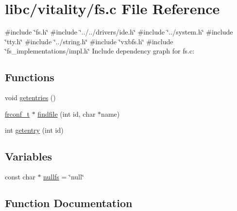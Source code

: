 \hypertarget{a00143}{}\section{libc/vitality/fs.c File Reference}
\label{a00143}
{\ttfamily \#include \char`\"{}fs.\+h\char`\"{}}\newline
{\ttfamily \#include \char`\"{}../../drivers/ide.\+h\char`\"{}}\newline
{\ttfamily \#include \char`\"{}../system.\+h\char`\"{}}\newline
{\ttfamily \#include \char`\"{}tty.\+h\char`\"{}}\newline
{\ttfamily \#include \char`\"{}../string.\+h\char`\"{}}\newline
{\ttfamily \#include \char`\"{}vxbfs.\+h\char`\"{}}\newline
{\ttfamily \#include \char`\"{}fs\+\_\+implementations/impl.\+h\char`\"{}}\newline
Include dependency graph for fs.\+c\+:
\subsection*{Functions}
\begin{DoxyCompactItemize}
\item 
void \hyperlink{a00143_a414110036132977c34813673360e1a63_a414110036132977c34813673360e1a63}{getentries} ()
\item 
\hyperlink{a00185_a752f1bef3c13b98d682fddc44a9e47c8_a752f1bef3c13b98d682fddc44a9e47c8}{frconf\+\_\+t} $\ast$ \hyperlink{a00143_a5c15724e6f3ef2c0df67ccedfc8639eb_a5c15724e6f3ef2c0df67ccedfc8639eb}{findfile} (int id, char $\ast$name)
\item 
int \hyperlink{a00143_a3fb32d07d3bd05144a196c94fc59c0d1_a3fb32d07d3bd05144a196c94fc59c0d1}{getentry} (int id)
\end{DoxyCompactItemize}
\subsection*{Variables}
\begin{DoxyCompactItemize}
\item 
const char $\ast$ \hyperlink{a00143_a36265ac74fd925405e1179e799961f1e_a36265ac74fd925405e1179e799961f1e}{nullfs} = \char`\"{}null\char`\"{}
\end{DoxyCompactItemize}


\subsection{Function Documentation}
\mbox{\label{a00143_a5c15724e6f3ef2c0df67ccedfc8639eb_a5c15724e6f3ef2c0df67ccedfc8639eb}} 
